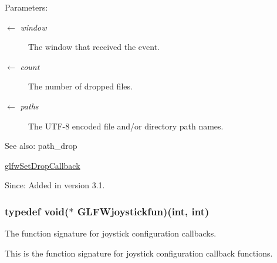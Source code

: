 \begin{Desc}
\item[Parameters:]
\begin{description}
\item[\mbox{$\leftarrow$} {\em window}]The window that received the event. \item[\mbox{$\leftarrow$} {\em count}]The number of dropped files. \item[\mbox{$\leftarrow$} {\em paths}]The UTF-8 encoded file and/or directory path names.\end{description}
\end{Desc}
\begin{Desc}
\item[See also:]path\_\-drop 

\hyperlink{group__input_gd4fc40df63a5d0441ab06de9a585cc04}{glfwSetDropCallback}\end{Desc}
\begin{Desc}
\item[Since:]Added in version 3.1. \end{Desc}
\hypertarget{group__input_g488fd02f577e56f908a8f305dd226dbf}{
\subsubsection[GLFWjoystickfun]{\setlength{\rightskip}{0pt plus 5cm}typedef void($\ast$  {\bf GLFWjoystickfun})(int, int)}}
\label{group__input_g488fd02f577e56f908a8f305dd226dbf}


The function signature for joystick configuration callbacks. 

This is the function signature for joystick configuration callback functions.

